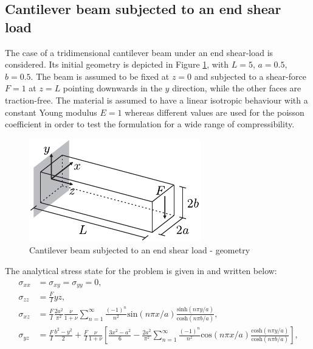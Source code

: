\documentclass[english,11pt,3p,number,sort&compress]{elsarticle}
\begin{document}
\subsection{Cantilever beam subjected to an end shear load \label{subsec:bishop}}

The case of a tridimensional cantilever beam under an end shear-load is considered. Its initial geometry is depicted in Figure \ref{fig:bishop-beam-geometry}, with $L=5$, $a=0.5$, $b=0.5$. The beam is assumed to be fixed at $z=0$ and subjected to a shear-force $F=1$ at $z=L$ pointing downwards in the $y$ direction, while the other faces are traction-free. The material is assumed to have a linear isotropic behaviour with a constant Young modulus $E=1$ whereas different values are used for the poisson coefficient in order to test the formulation for a wide range of compressibility.

\begin{figure}[H]
	\centering
	\includegraphics[scale=1.0]{bishop-beam-geometry}
	\caption{Cantilever beam subjected to an end shear load - geometry}
	\label{fig:bishop-beam-geometry}
\end{figure}

The analytical stress state for the problem is given in \cite{bishop2014displacement} and written below:
\begin{equation} \label{eq:bishop-stress}
	\begin{aligned}
		\sigma_{xx} &= \sigma_{xy} = \sigma_{yy} = 0 \text{,}\\
		\sigma_{zz} &= \frac{F}{I} yz \text{,}\\
		\sigma_{xz} &= \frac{F}{I} \frac{2a^2}{\pi^2}\frac{\nu}{1+\nu} \sum_{n=1}^{\infty} \frac{(-1)^n}{n^2} \text{sin}\left(n\pi x/a\right) \frac{\text{sinh}\left( n\pi y/a \right)}{\text{cosh}\left( n\pi b/a \right)} \text{,}\\
		\sigma_{yz} &= \frac{F}{I} \frac{b^2-y^2}{2} + \frac{F}{I}\frac{\nu}{1+\nu} \left[ \frac{3x^2-a^2}{6} - \frac{2a^2}{\pi^2} \sum_{n=1}^{\infty} \frac{(-1)^n}{n^2} \text{cos}\left(n\pi x/a\right) \frac{\text{cosh}\left( n\pi y/a \right)}{\text{cosh}\left( n\pi b/a \right)}  \right]\text{,}\\
	\end{aligned}
\end{equation}
\end{document}
